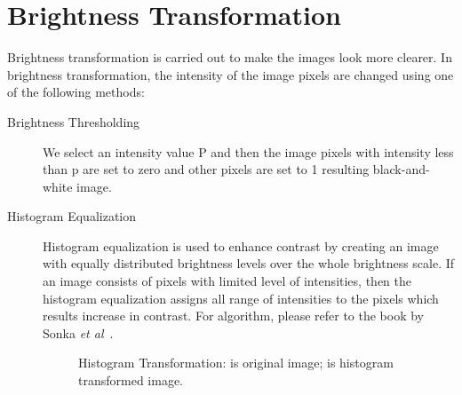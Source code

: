 \section{Brightness Transformation}
Brightness transformation is carried out to make the images look more clearer. In brightness transformation, the intensity of the image pixels are changed using one of the following methods:
\begin{description}
\item[Brightness Thresholding]
We select an intensity value P and then the image pixels with intensity less than p are set to zero and other pixels are set to 1 resulting black-and-white image. 

\item[Histogram Equalization]
Histogram equalization is used to enhance contrast by creating an image with equally distributed brightness levels over the whole brightness scale. If an image consists of pixels with limited level of intensities, then the histogram equalization assigns all range of intensities to the pixels which results increase in contrast. For algorithm, please refer to the book by Sonka \textit{et al}~\cite{Sonka:08}.

\begin{figure}%
\centering
{}%
\hspace{8pt}%
%
\caption[Histogram Transformation]{Histogram Transformation:
	 is original image;
	 is histogram transformed image.}%
\label{fig:hist_trans}%
\end{figure}


\end{description}
